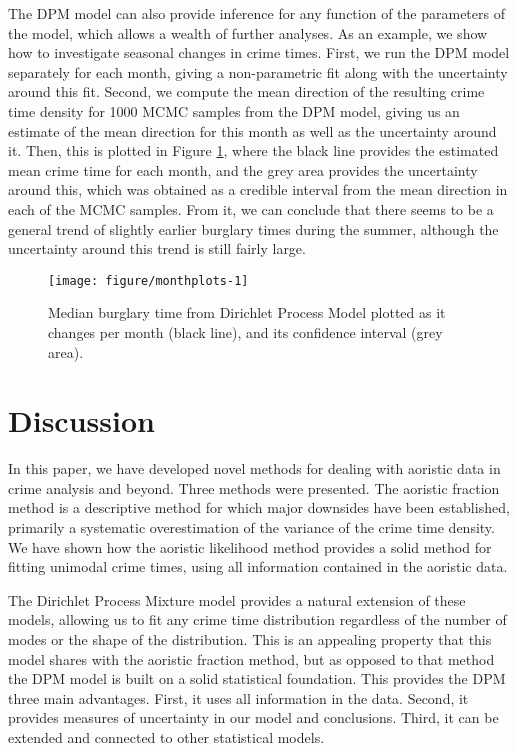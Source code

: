The DPM model can also provide inference for any function of the parameters of the model, which allows a wealth of further analyses. As an example, we show how to investigate seasonal changes in crime times. First, we run the DPM model separately for each month, giving a non-parametric fit along with the uncertainty around this fit. Second, we compute the mean direction of the resulting crime time density for 1000 MCMC samples from the DPM model, giving us an estimate of the mean direction for this month as well as the uncertainty around it. Then, this is plotted in Figure \ref{month_plot}, where the black line provides the estimated mean crime time for each month, and the grey area provides the uncertainty around this, which was obtained as a credible interval from the mean direction in each of the MCMC samples. From it, we can conclude that there seems to be a general trend of slightly earlier burglary times during the summer, although the uncertainty around this trend is still fairly large.

\begin{figure}
\centering
\begin{knitrout}
\color{fgcolor}
\texttt{[image: figure/monthplots-1]} 

\end{knitrout}
\caption{Median burglary time from Dirichlet Process Model plotted as it changes per month (black line), and its confidence interval (grey area).} \label{month_plot}
\end{figure}



\section{Discussion} \label{discussion}

In this paper, we have developed novel methods for dealing with aoristic data in crime analysis and beyond. Three methods were presented. The aoristic fraction method is a descriptive method for which major downsides have been established, primarily a systematic overestimation of the variance of the crime time density. We have shown how the aoristic likelihood method provides a solid method for fitting unimodal crime times, using all information contained in the aoristic data.

The Dirichlet Process Mixture model provides a natural extension of these models, allowing us to fit any crime time distribution regardless of the number of modes or the shape of the distribution. This is an appealing property that this model shares with the aoristic fraction method, but as opposed to that method the DPM model is built on a solid statistical foundation. This provides the DPM three main advantages. First, it uses all information in the data. Second, it provides measures of uncertainty in our model and conclusions. Third, it can be extended and connected to other statistical models.


